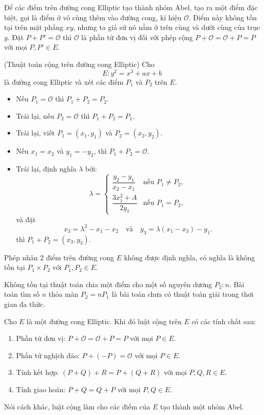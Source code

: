 \documentclass[../main.tex]{subfiles}
\begin{document}
Để các điểm trên đường cong Elliptic tạo thành nhóm Abel, tạo ra một điểm đặc biệt, gọi là điểm ở vô cùng thêm vào đường cong, kí hiệu $\mathcal{O}$. Điểm này không tồn tại trên mặt phẳng $xy$, nhưng ta giả sử nó nằm ở trên cùng và dưới cùng của trục $y$.  Đặt $P+P'=\mathcal{O}$ thì $\mathcal{O}$ là phần tử đơn vị đối với phép cộng $P+\mathcal{O}=\mathcal{O}+P=P$ với mọi $P,P'\in E$.
\begin{dl}
\label{thm: 1}
(Thuật toán cộng trên đường cong Elliptic) Cho 
$$E\colon y^2=x^3+ax+b$$
là đường cong Elliptic và xét các điểm $P_1$ và $P_2$ trên $E$.
\begin{itemize}
\item Nếu $P_1=\mathcal{O}$ thì $P_1+P_2=P_2$.
\item Trái lại, nếu  $P_2=\mathcal{O}$ thì $P_1+P_2=P_1$.
\item Trái lại, viết $P_1=(x_1,y_1)$ và $P_2=(x_2,y_2)$.
\item Nếu $x_1=x_2$ và $y_1=-y_2$, thì $P_1+P_2=\mathcal{O}$.
\item Trái lại, định nghĩa $\lambda$ bởi:
$$\lambda=\begin{cases}
\dfrac{y_2-y_1}{x_2-x_1}&\text{nếu }P_1\ne P_2,\\
\dfrac{3x_1^2+A}{2y_1}&\text{nếu }P_1=P_2,
\end{cases}$$
và đặt
$$x_3=\lambda^2-x_1-x_2\quad \text{và}\quad y_3=\lambda(x_1-x_3)-y_1.$$
thì $P_1+P_2=(x_3,y_3)$.
\end{itemize}
\end{dl}

Phép nhân 2 điểm trên đường cong $E$ không được định nghĩa, có nghĩa là không tồn tại $P_1\times P_2$ với $P_1,P_2\in E$.

Không tồn tại thuật toán chia một điểm cho một số nguyên dương $P_2: n$. Bài toán tìm số $n$ thỏa mãn $P_2=nP_1$ là bài toán chưa có thuật toán giải trong thơi gian đa thức.
\begin{dl}
\label{thm: 2}
Cho $E$ là một đường cong Elliptic. Khi đó luật cộng trên $E$ có các tính chất sau:
\begin{enumerate}
\item Phần tử đơn vị: $P+\mathcal{O}=\mathcal{O}+P=P$ với mọi $P\in E$.
\item Phần tử nghịch đảo: $P+(-P)=\mathcal{O}$ với mọi $P\in E$.
\item Tính kết hợp: $(P+Q)+R=P+(Q+R)$ với mọi $P,Q,R\in E$.
\item Tính giao hoán: $P+Q=Q+P$ với mọi $P,Q\in E$.
\end{enumerate}
Nói cách khác, luật cộng làm cho các điểm của $E$ tạo thành một nhóm Abel.
\end{dl}
\end{document}
